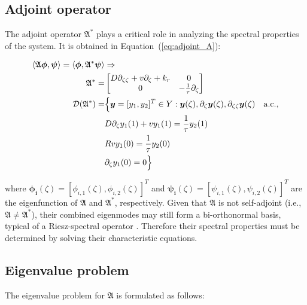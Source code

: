 \subsection{Adjoint operator}

The adjoint operator $\mathfrak{A}^*$ plays a critical role in analyzing the spectral properties of the system. It is obtained in Equation~(\ref{eq:adjoint_A}):

\begin{equation} \label{eq:adjoint_A}
    \begin{aligned}
        \langle \mathfrak{A} \bm{\phi}, \bm{\psi}\rangle  = \langle \bm{\phi}, {\mathfrak{A}}^{*} \bm{\psi}\rangle  &\Rightarrow \\
        {\mathfrak{A}}^{*} =&
        \begin{bmatrix}
            D \partial_{\zeta \zeta} + v \partial_\zeta +k_r & 0\\
            0 & -\frac{1}{\tau} \partial_\zeta
        \end{bmatrix}\\
        \mathcal{D}(\mathfrak{A}^*) =& \Bigl\{ \bm{y} = [y_1, y_2]^T \in Y:
        \bm{y}(\zeta), \partial_\zeta \bm{y}(\zeta), \partial_{\zeta \zeta} \bm{y}(\zeta) \quad \mathrm{a.c.},\\
        &D \partial_\zeta y_1(1) + v y_1(1) = \frac{1}{\tau} y_2(1) \\
        &R v y_1(0) = \frac{1}{\tau} y_2(0) \\
        &\partial_\zeta y_1(0) = 0 \Bigr\}
    \end{aligned}
\end{equation}

where $\bm{\phi_i}(\zeta) = [\phi_{i,1}(\zeta), \phi_{i,2}(\zeta)]^T$ and $\bm{\psi_i}(\zeta) = [\psi_{i,1}(\zeta), \psi_{i,2}(\zeta)]^T$ are the eigenfunction of $\mathfrak{A}$ and $\mathfrak{A}^*$, respectively. Given that $\mathfrak{A}$ is not self-adjoint (i.e., $\mathfrak{A} \neq \mathfrak{A}^*$), their combined eigenmodes may still form a bi-orthonormal basis, typical of a Riesz-spectral operator \autocite{curtainbook}. Therefore their spectral properties must be determined by solving their characteristic equations.

\subsection{Eigenvalue problem}

The eigenvalue problem for $\mathfrak{A}$ is formulated as follows:

